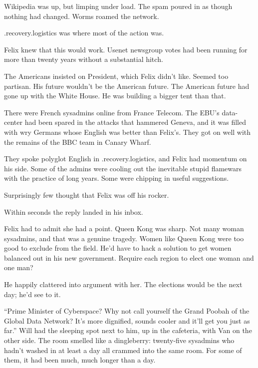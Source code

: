 Wikipedia was up, but limping under load. The spam poured in as
though nothing had changed. Worms roamed the network.

.recovery.logistics was where most of the action was.

Felix knew that this would work. Usenet newsgroup votes had been
running for more than twenty years without a substantial hitch.

The Americans insisted on President, which Felix didn’t like.
Seemed too partisan. His future wouldn’t be the American future.
The American future had gone up with the White House. He was
building a bigger tent than that.

There were French sysadmins online from France Telecom. The EBU’s
data-center had been spared in the attacks that hammered Geneva,
and it was filled with wry Germans whose English was better than
Felix’s. They got on well with the remains of the BBC team in
Canary Wharf.

They spoke polyglot English in .recovery.logistics, and Felix had
momentum on his side. Some of the admins were cooling out the
inevitable stupid flamewars with the practice of long years. Some
were chipping in useful suggestions.

Surprisingly few thought that Felix was off his rocker.

Within seconds the reply landed in his inbox.

Felix had to admit she had a point. Queen Kong was sharp. Not many
woman sysadmins, and that was a genuine tragedy. Women like Queen
Kong were too good to exclude from the field. He’d have to hack a
solution to get women balanced out in his new government. Require
each region to elect one woman and one man?

He happily clattered into argument with her. The elections would be
the next day; he’d see to it.

\tb

“Prime Minister of Cyberspace? Why not call yourself the Grand
Poobah of the Global Data Network? It’s more dignified, sounds
cooler and it’ll get you just as far.” Will had the sleeping spot
next to him, up in the cafeteria, with Van on the other side. The
room smelled like a dingleberry: twenty-five sysadmins who hadn’t
washed in at least a day all crammed into the same room. For some
of them, it had been much, much longer than a day.

